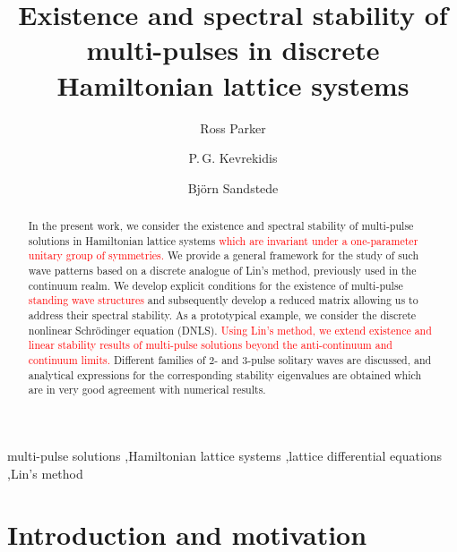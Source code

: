 \documentclass[12pt]{elsarticle}
\newcommand{\revised}[1]{ \textcolor{red}{#1} }
\begin{document}
\begin{frontmatter}

\title{Existence and spectral stability of multi-pulses in discrete Hamiltonian lattice systems}

\author[1]{Ross Parker}
\author[2,3]{P.\,G. Kevrekidis} 
\author[1]{Bj\"{o}rn Sandstede}

\address[1]{Division of Applied Mathematics, Brown University, Providence, RI 02912, USA}
\address[2]{Department of Mathematics and Statistics, University of Massachusetts, Amherst MA 01003, USA}
\address[3]{Mathematical Institute, University of Oxford, Oxford, OX2 6GG, UK}

\begin{abstract}
    In the present work, we consider the existence and spectral stability of multi-pulse solutions in Hamiltonian lattice systems \revised{which are invariant under a one-parameter unitary group of symmetries.} We provide a general framework for the study of such wave patterns based on a discrete analogue of Lin's method, previously used in the continuum realm. We develop explicit conditions for the existence of multi-pulse \revised{standing wave structures} and subsequently develop a reduced matrix allowing us to address their spectral stability. As a prototypical example, we consider the discrete nonlinear Schr\"{o}dinger equation (DNLS). \revised{Using Lin's method, we extend existence and linear stability results of multi-pulse solutions beyond the anti-continuum and continuum limits.} Different families of $2$- and $3$-pulse solitary waves are discussed, and analytical expressions for the corresponding stability eigenvalues are obtained which are in very good agreement with numerical results.
\end{abstract}

\begin{keyword}
multi-pulse solutions \sep Hamiltonian lattice systems \sep lattice differential equations \sep Lin's method 
\end{keyword}

\end{frontmatter}

\section{Introduction and motivation}
\end{document}
